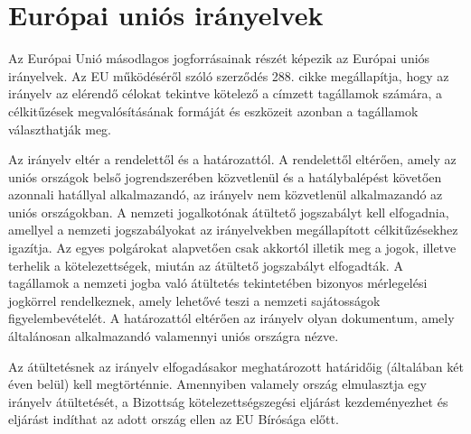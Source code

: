 \section{Európai uniós irányelvek}

Az Európai Unió másodlagos jogforrásainak részét képezik az Európai uniós irányelvek. Az EU működéséről szóló szerződés 288. cikke megállapítja, hogy az irányelv az elérendő célokat tekintve kötelező a címzett tagállamok számára, a célkitűzések megvalósításának formáját és eszközeit azonban a tagállamok választhatják meg. 

Az irányelv eltér a rendelettől és a határozattól. A rendelettől eltérően, amely az uniós országok belső jogrendszerében közvetlenül és a hatálybalépést követően azonnali hatállyal alkalmazandó, az irányelv nem közvetlenül alkalmazandó az uniós országokban. A nemzeti jogalkotónak átültető jogszabályt kell elfogadnia, amellyel a nemzeti jogszabályokat az irányelvekben megállapított célkitűzésekhez igazítja. Az egyes polgárokat alapvetően csak akkortól illetik meg a jogok, illetve terhelik a kötelezettségek, miután az átültető jogszabályt elfogadták. A tagállamok a nemzeti jogba való átültetés tekintetében bizonyos mérlegelési jogkörrel rendelkeznek, amely lehetővé teszi a nemzeti sajátosságok figyelembevételét. A határozattól eltérően az irányelv olyan dokumentum, amely általánosan alkalmazandó valamennyi uniós országra nézve.

Az átültetésnek az irányelv elfogadásakor meghatározott határidőig (általában két éven belül) kell megtörténnie. Amennyiben valamely ország elmulasztja egy irányelv átültetését, a Bizottság kötelezettségszegési eljárást kezdeményezhet és eljárást indíthat az adott ország ellen az EU Bírósága előtt. \cite{EU-jog, EU-iranyelvek}